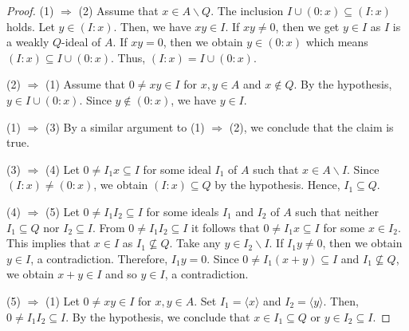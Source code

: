 \documentclass[10pt,a4paper]{amsart}
\begin{document}
\begin{proof}
(1) $\Longrightarrow $ (2) Assume that $x \in A \backslash Q$. The inclusion $I \cup (0 : x) \subseteq (I:x)$ holds. Let $y \in (I : x)$. Then, we have $xy \in I$. If $xy \neq 0$, then we get $y \in I$ as $I$ is a weakly $Q$-ideal of $A$. If $xy=0$, then we obtain $y \in (0:x)$ which means $(I:x) \subseteq I \cup (0:x)$. Thus, $(I:x)=I \cup (0:x)$.

(2) $\Longrightarrow $ (1) Assume that $0 \neq xy \in I$ for $x,y \in A$ and $x \notin Q$. By the hypothesis, $y \in I \cup (0 : x)$. Since $y \notin (0:x)$, we have $y \in I$. 

(1) $\Longrightarrow $ (3) By a similar argument to (1) $\Longrightarrow $ (2), we conclude that  the claim is true.

(3) $\Longrightarrow $ (4) Let $0 \neq I_1 x \subseteq I$    for some ideal $I_1$ of $A$  such that $x \in A \backslash I$. Since  $(I : x) \neq (0 : x)$, we obtain  $(I : x) \subseteq Q$ by the hypothesis. Hence, $I_1 \subseteq Q$.


(4) $\Longrightarrow $ (5) Let $0 \neq I_1I_2 \subseteq I$ for some ideals $I_1$ and $I_2$  of $A$ such that neither $I_1 \subseteq Q$ nor $I_2 \subseteq I$. From $0 \neq I_1I_2 \subseteq I$ it follows that $0 \neq I_1 x \subseteq I$ for some $x \in I_2$. This implies that $x \in I$ as $I_1 \nsubseteq Q$. Take any $y \in I_2 \backslash I$. If $I_1 y \neq 0$, then we obtain $y \in I$, a contradiction. Therefore, $I_1 y=0$. Since $0 \neq I_1(x+y) \subseteq I$ and $I_1 \nsubseteq Q$, we obtain $x+y \in I$ and so $y \in I$, a contradiction. 

(5) $\Longrightarrow $ (1) Let $0 \neq xy \in I$ for $x,y \in A$. Set $I_1=\langle x \rangle$ and $I_2=\langle y \rangle$. Then, $0 \neq I_1 I_2 \subseteq I$. By the hypothesis, we conclude that $x \in I_1 \subseteq Q$ or $y \in I_2 \subseteq I$. 
\end{proof}
\end{document}
